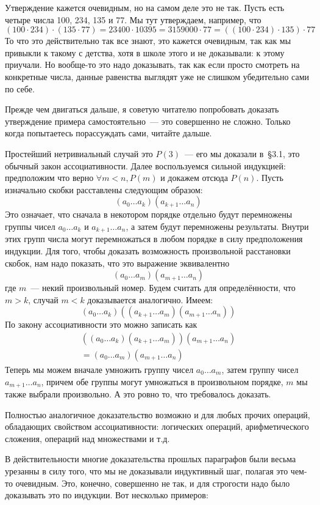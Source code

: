 Утверждение кажется очевидным, но на самом деле это не так. Пусть есть четыре числа 100, 234, 135 и 77. Мы тут утверждаем, например, что
$$(100\cdot 234)\cdot (135 \cdot77) = 23400 \cdot 10395 = 3159000 \cdot 77 = ((100\cdot 234)\cdot 135) \cdot77$$
То что это действительно так все знают, это кажется очевидным, так как мы привыкли к такому с детства, хотя в школе этого и не доказывали: к этому приучали. Но вообще-то это надо доказывать, так как если просто смотреть на конкретные числа, данные равенства выглядят уже не слишком убедительно сами по себе.

Прежде чем двигаться дальше, я советую читателю попробовать доказать утверждение примера самостоятельно~--- это совершенно не сложно. Только когда попытаетесь порассуждать сами, читайте дальше.

Простейший нетривиальный случай это $P(3)$~--- его мы доказали в~\S3.1, это обычный закон ассоциативности. Далее воспользуемся сильной индукцией: предположим что верно $\forall m<n, P(m)$ и докажем отсюда $P(n)$. Пусть изначально скобки расставлены следующим образом:
$$(a_0\ldots a_k)(a_{k+1}\ldots a_n)$$
Это означает, что сначала в некотором порядке отдельно будут перемножены группы чисел $a_0\ldots a_k$ и $a_{k+1}\ldots a_n$, а затем будут перемножены результаты. Внутри этих групп числа могут перемножаться в любом порядке в силу предположения индукции. Для того, чтобы доказать возможность произвольной расстановки скобок, нам надо показать, что это выражение эквивалентно
$$(a_0\ldots a_m)(a_{m+1}\ldots a_n)$$
где $m$~--- некий произвольный номер. Будем считать для определённости, что $m>k$, случай $m<k$ доказывается аналогично. Имеем:
$$(a_0\ldots a_k)((a_{k+1}\ldots a_m)(a_{m+1}\ldots a_n))$$
По закону ассоциативности это можно записать как
\begin{align*}
((a_0\ldots a_k)(a_{k+1}\ldots a_m))(a_{m+1}\ldots a_n)\\
= (a_0\ldots  a_m)(a_{m+1}\ldots a_n)
\end{align*}
Теперь мы можем вначале умножить группу чисел $a_0\ldots a_m$, затем группу чисел $a_{m+1}\ldots a_n$, причем обе группы могут умножаться в произвольном порядке, $m$ мы также выбрали произвольно. А это ровно то, что требовалось доказать.

Полностью аналогичное доказательство возможно и для любых прочих операций, обладающих свойством ассоциативности: логических операций, арифметического сложения, операций над множествами и т.д.

В действительности многие доказательства прошлых параграфов были весьма урезанны в силу того, что мы не доказывали индуктивный шаг, полагая это чем-то очевидным. Это, конечно, совершенно не так, и для строгости надо было доказывать это по индукции. Вот несколько примеров:

